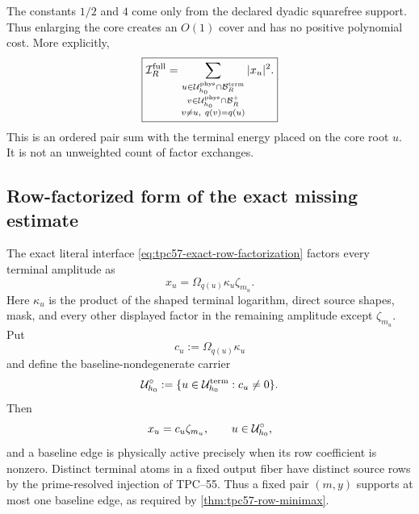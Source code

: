 The constants \(1/2\) and \(4\) come only from the declared dyadic
squarefree support.  Thus enlarging the core creates an \(O(1)\) cover and
has no positive polynomial cost.  More explicitly,
\begin{equation}
 \boxed{
 \mathcal I_R^{\rm full}
 =\sum_{\substack{u\in\mathcal U_{h_0}^{\rm phys}\cap\mathcal B_R^{\rm term}\\
                  v\in\mathcal U_{h_0}^{\rm phys}\cap\mathcal B_R^+\\
                  v\ne u,\ q(v)=q(u)}}|x_u|^2.}
 \label{eq:tpc57-enlarged-rooted-pair-identity}
\end{equation}
This is an ordered pair sum with the terminal energy placed on the core
root \(u\).  It is not an unweighted count of factor exchanges.

\subsection{Row-factorized form of the exact missing estimate}

The exact literal interface
\eqref{eq:tpc57-exact-row-factorization} factors every terminal amplitude as
\begin{equation}
 x_u=\Omega_{q(u)}\kappa_u\zeta_{m_u}.
 \label{eq:tpc57-literal-row-factorization}
\end{equation}
Here \(\kappa_u\) is the product of the shaped terminal logarithm, direct
source shapes, mask, and every other displayed factor in the remaining
amplitude except \(\zeta_{m_u}\).  Put
\begin{equation}
 c_u:=\Omega_{q(u)}\kappa_u
 \label{eq:tpc57-baseline-physical-amplitude}
\end{equation}
and define the baseline-nondegenerate carrier
\begin{equation}
 \mathcal U_{h_0}^{\circ}
 :=\{u\in\mathcal U_{h_0}^{\rm term}:c_u\ne0\}.
 \label{eq:tpc57-baseline-terminal-carrier}
\end{equation}
Then
\begin{equation}
 x_u=c_u\zeta_{m_u},
 \qquad
 u\in\mathcal U_{h_0}^{\circ},
 \label{eq:tpc57-baseline-times-row-coefficient}
\end{equation}
and a baseline edge is physically active precisely when its row coefficient
is nonzero.  Distinct terminal atoms in a fixed output fiber have distinct
source rows by the prime-resolved injection of TPC--55.  Thus a fixed pair
\((m,y)\) supports at most one baseline edge, as required by
\cref{thm:tpc57-row-minimax}.

